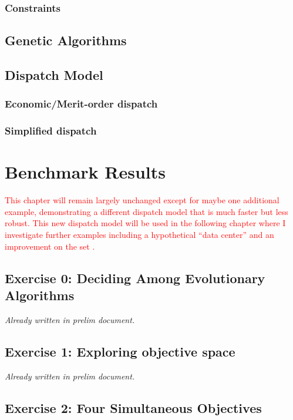 \subsection{Constraints}

\section{Genetic Algorithms}

\section{Dispatch Model}

\subsection{Economic/Merit-order dispatch}

\subsection{Simplified dispatch}


\chapter{Benchmark Results}
\label{chapter:benchmark-results}

\textcolor{red}{This chapter will remain largely unchanged except for maybe one
additional example, demonstrating a different dispatch model that is much faster
but less robust. This new dispatch model will be used in the following chapter
where I investigate further examples including a hypothetical ``data center''
and an improvement on the \acf{set} \cite{wigeland_nuclear_2014}.}

\section{Exercise 0: Deciding Among Evolutionary Algorithms}

\textit{Already written in prelim document.}

\section{Exercise 1: Exploring objective space}

\textit{Already written in prelim document.}

\section{Exercise 2: Four Simultaneous Objectives}

